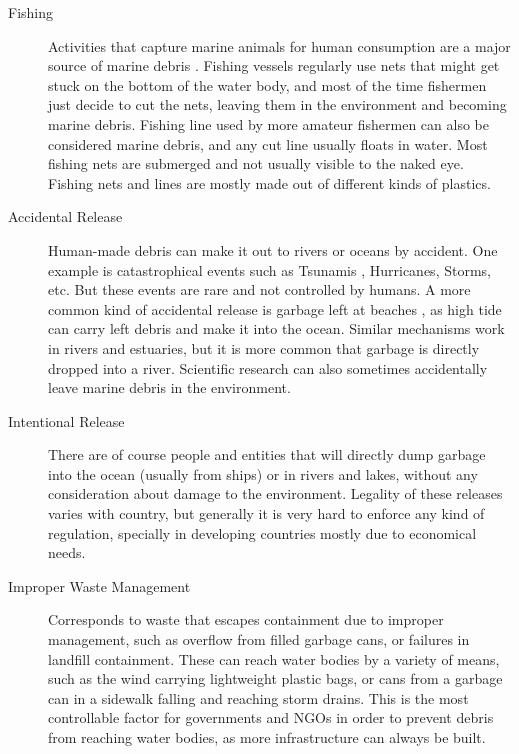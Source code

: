 \begin{description}
    \item[Fishing] Activities that capture marine animals for human consumption are a major source of marine debris \cite{dayton1995environmental}. Fishing vessels regularly use nets that might get stuck on the bottom of the water body, and most of the time fishermen just decide to cut the nets, leaving them in the environment and becoming marine debris. Fishing line used by more amateur fishermen can also be considered marine debris, and any cut line usually floats in water. Most fishing nets are submerged and not usually visible to the naked eye. Fishing nets and lines are mostly made out of different kinds of plastics.
    
    \item[Accidental Release] Human-made debris can make it out to rivers or oceans by accident. One example is catastrophical events such as Tsunamis \cite[-10em]{mori2011survey}, Hurricanes, Storms, etc. But these events are rare and not controlled by humans. A more common kind of accidental release is garbage left at beaches \cite[-6em]{smith1997marine}, as high tide can carry left debris and make it into the ocean. Similar mechanisms work in rivers and estuaries, but it is more common that garbage is directly dropped into a river. Scientific research can also sometimes accidentally leave marine debris in the environment.
    
    \item[Intentional Release] There are of course people and entities that will directly dump garbage into the ocean (usually from ships) or in rivers and lakes, without any consideration about damage to the environment. Legality of these releases varies with country, but generally it is very hard to enforce any kind of regulation, specially in developing countries mostly due to economical needs.
    
    \item[Improper Waste Management] Corresponds to waste that escapes containment\cite{willis2017differentiating} due to improper management, such as overflow from filled garbage cans, or failures in landfill containment. These can reach water bodies by a variety of means, such as the wind carrying lightweight plastic bags, or cans from a garbage can in a sidewalk falling and reaching storm drains. This is the most controllable factor for governments and NGOs in order to prevent debris from reaching water bodies, as more infrastructure can always be built.
\end{description}

